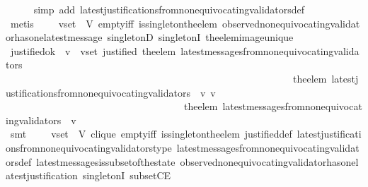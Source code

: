 \begin{isabellebody}
\ \ \ \ \isamarkupfalse%
\ {\isacharparenleft}simp\ add{\isacharcolon}\ latest{\isacharunderscore}justifications{\isacharunderscore}from{\isacharunderscore}non{\isacharunderscore}equivocating{\isacharunderscore}validators{\isacharunderscore}def{\isacharparenright}\isanewline
\ \ \ \ \isamarkupfalse%
\ {\isacharparenleft}metis\ {\isacartoucheopen}{\isasymsigma}\ {\isasymin}\ {\isasymSigma}\ {\isasymand}\ v{\isacharunderscore}set\ {\isasymsubseteq}\ V{\isacartoucheclose}\ empty{\isacharunderscore}iff\ is{\isacharunderscore}singleton{\isacharunderscore}the{\isacharunderscore}elem\ observed{\isacharunderscore}non{\isacharunderscore}equivocating{\isacharunderscore}validator{\isacharunderscore}has{\isacharunderscore}one{\isacharunderscore}latest{\isacharunderscore}message\ singletonD\ singletonI\ the{\isacharunderscore}elem{\isacharunderscore}image{\isacharunderscore}unique{\isacharparenright}\isanewline
\ \ \isamarkupfalse%
\ \isamarkupfalse%
\ justified{\isacharunderscore}ok{\isacharcolon}\ {\isachardoublequoteopen}{\isasymforall}\ v\ {\isasymin}\ v{\isacharunderscore}set{\isachardot}\ justified\ {\isacharparenleft}the{\isacharunderscore}elem\ {\isacharparenleft}latest{\isacharunderscore}messages{\isacharunderscore}from{\isacharunderscore}non{\isacharunderscore}equivocating{\isacharunderscore}validators\ \isanewline
\ \ \ \ \ \ \ \ \ \ \ \ \ \ \ \ \ \ \ \ \ \ \ \ \ \ \ \ \ \ \ \ \ \ \ \ \ \ \ \ \ \ \ \ \ \ \ \ \ \ \ \ \ \ \ \ \ \ {\isacharparenleft}the{\isacharunderscore}elem\ {\isacharparenleft}latest{\isacharunderscore}justifications{\isacharunderscore}from{\isacharunderscore}non{\isacharunderscore}equivocating{\isacharunderscore}validators\ {\isasymsigma}\ v{\isacharparenright}{\isacharparenright}\ v{\isacharparenright}{\isacharparenright}\isanewline
\ \ \ \ \ \ \ \ \ \ \ \ \ \ \ \ \ \ \ \ \ \ \ \ \ \ \ \ \ \ \ \ \ \ \ \ {\isacharparenleft}the{\isacharunderscore}elem\ {\isacharparenleft}latest{\isacharunderscore}messages{\isacharunderscore}from{\isacharunderscore}non{\isacharunderscore}equivocating{\isacharunderscore}validators\ {\isasymsigma}\ v{\isacharparenright}{\isacharparenright}{\isachardoublequoteclose}\isanewline
\ \ \ \ \isamarkupfalse%
\ {\isacharparenleft}smt\ {\isacartoucheopen}{\isasymsigma}\ {\isasymin}\ {\isasymSigma}\ {\isasymand}\ v{\isacharunderscore}set\ {\isasymsubseteq}\ V{\isacartoucheclose}\ clique\ empty{\isacharunderscore}iff\ is{\isacharunderscore}singleton{\isacharunderscore}the{\isacharunderscore}elem\ justified{\isacharunderscore}def\ latest{\isacharunderscore}justifications{\isacharunderscore}from{\isacharunderscore}non{\isacharunderscore}equivocating{\isacharunderscore}validators{\isacharunderscore}type\ latest{\isacharunderscore}messages{\isacharunderscore}from{\isacharunderscore}non{\isacharunderscore}equivocating{\isacharunderscore}validators{\isacharunderscore}def\ latest{\isacharunderscore}messages{\isacharunderscore}is{\isacharunderscore}subset{\isacharunderscore}of{\isacharunderscore}the{\isacharunderscore}state\ observed{\isacharunderscore}non{\isacharunderscore}equivocating{\isacharunderscore}validator{\isacharunderscore}has{\isacharunderscore}one{\isacharunderscore}latest{\isacharunderscore}justification\ singletonI\ subsetCE{\isacharparenright}\isanewline

\end{isabellebody}

